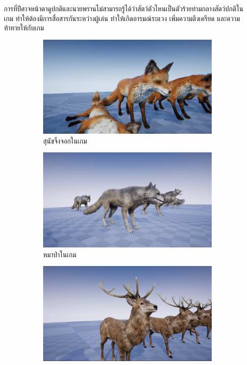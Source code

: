 การที่ปีศาจหน้าตาดูปกติและนายพรานไม่สามารถรู้ได้ว่าสัตว์ตัวไหนเป็นตัวร้ายท่ามกลางสัตว์ปกติในเกม ทำให้ต้องมีการสื่อสารกันระหว่างผู้เล่น ทำให้เกิดอารมณ์ระแวง เพิ่มความตึงเครียด และความท้าทายให้กับเกม

\begin{figure}[h]
  \centering
  \begin{subfigure}{0.4\textwidth}
    \includegraphics[width=\textwidth]{./img/fox.png}
    \caption[สุนัขจิ้งจอกในเกม]{สุนัขจิ้งจอกในเกม}
    \label{fig:fox}
  \end{subfigure}
  \hfil
  \begin{subfigure}{0.4\textwidth}
    \includegraphics[width=\textwidth]{./img/wolf.png}
    \caption[หมาป่าในเกม]{หมาป่าในเกม}
    \label{fig:wolf}
  \end{subfigure}
  \hfil
  \begin{subfigure}{0.4\textwidth}
    \includegraphics[width=\textwidth]{./img/deerstag.png}

\end{subfigure}
\end{figure}
